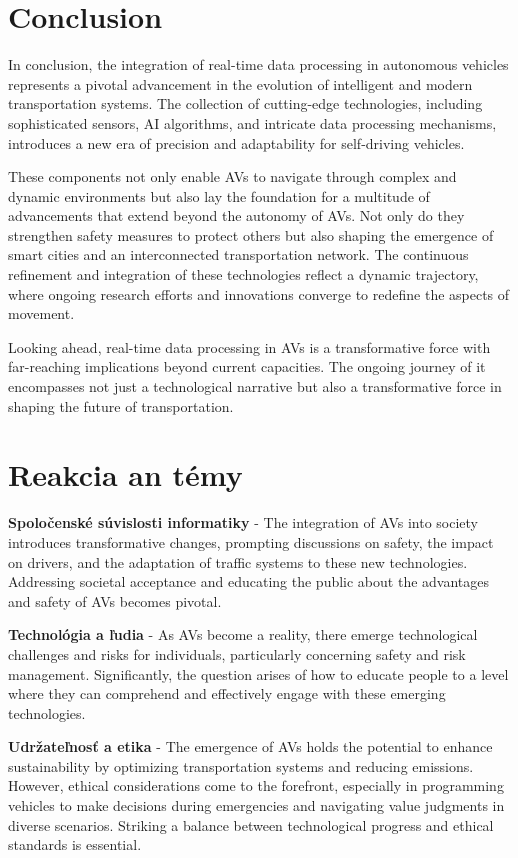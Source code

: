 \documentclass[10pt,oneside,english,a4paper]{article}
\begin{document}

\section{Conclusion} \label{conclusion}
\par In conclusion, the integration of real-time data processing in autonomous vehicles represents a pivotal advancement in the evolution of intelligent and modern transportation systems. The collection of cutting-edge technologies, including sophisticated sensors, AI algorithms, and intricate data processing mechanisms, introduces a new era of precision and adaptability for self-driving vehicles. 
\par These components not only enable AVs to navigate through complex and dynamic environments but also lay the foundation for a multitude of advancements that extend beyond the autonomy of AVs. Not only do they strengthen safety measures to protect others but also shaping the emergence of smart cities and an interconnected transportation network. The continuous refinement and integration of these technologies reflect a dynamic trajectory, where ongoing research efforts and innovations converge to redefine the aspects of movement.
\par Looking ahead, real-time data processing in AVs is a transformative force with far-reaching implications beyond current capacities. The ongoing journey of it encompasses not just a technological narrative but also a transformative force in shaping the future of transportation.


\section{Reakcia an témy} 
\par \textbf{Spoločenské súvislosti informatiky} - The integration of AVs into society introduces transformative changes, prompting discussions on safety, the impact on drivers, and the adaptation of traffic systems to these new technologies. Addressing societal acceptance and educating the public about the advantages and safety of AVs becomes pivotal.
\par \textbf{Technológia a ľudia} - As AVs become a reality, there emerge technological challenges and risks for individuals, particularly concerning safety and risk management. Significantly, the question arises of how to educate people to a level where they can comprehend and effectively engage with these emerging technologies.
\par \textbf{Udržateľnosť a etika} - The emergence of AVs holds the potential to enhance sustainability by optimizing transportation systems and reducing emissions. However, ethical considerations come to the forefront, especially in programming vehicles to make decisions during emergencies and navigating value judgments in diverse scenarios. Striking a balance between technological progress and ethical standards is essential.


\newpage

\end{document}
